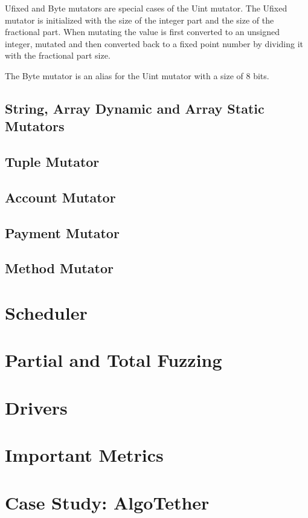 Ufixed and Byte mutators are special cases of the Uint mutator. The Ufixed mutator is initialized with the size of the integer part and the size of the fractional part. When mutating the value is first converted to an unsigned integer, mutated and then converted back to a fixed point number by dividing it with the fractional part size.

The Byte mutator is an alias for the Uint mutator with a size of 8 bits.

\subsection*{String, Array Dynamic and Array Static Mutators}

\subsection*{Tuple Mutator}

\subsection*{Account Mutator}

\subsection*{Payment Mutator}

\subsection*{Method Mutator}


\section{Scheduler}

\section{Partial and Total Fuzzing}

\section{Drivers}\label{section:drivers}

\section{Important Metrics}

\section{Case Study: AlgoTether}
